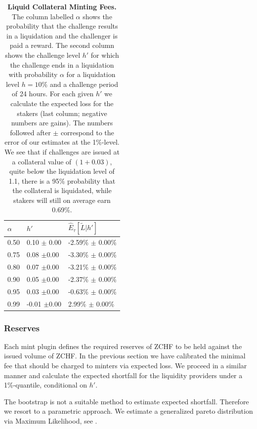 \documentclass[english,11pt]{article}
\begin{document}
\begin{table}[h]
\caption{\textbf{Liquid Collateral Minting Fees.} The column labelled $\alpha$ shows the probability
that the challenge results in a liquidation and the challenger is paid a reward.
The second column shows the challenge level $h'$ for which the challenge ends in a
liquidation with probability $\alpha$ for a liquidation level $h=10\%$ and a challenge
period of 24 hours. For each given $h'$ we calculate the expected loss for the stakers
(last column; negative numbers are gains).
The numbers followed after $\pm$ correspond to the error of our estimates at the 1\%-level.
We see that if challenges are issued at a collateral value of $(1+0.03)$, quite below the 
liquidation level of 1.1, there is
a 95\% probability that the collateral is liquidated, while stakers will still on average
earn 0.69\%.\label{tab:calibration}}
\center
\begin{tabular}{lll}
\toprule
\textbf{$\alpha$} & \textbf{$h'$}   & \textbf{$\hat{E}_{\tau}\left[\tilde{L} | h' \right]$}\\
\midrule
0.50                           & 0.10 $\pm$ 0.00 & -2.59\% $\pm$ 0.00\% \\
0.75                           & 0.08 $\pm$0.00  & -3.30\% $\pm$ 0.00\% \\
0.80                           & 0.07 $\pm$0.00  & -3.21\% $\pm$ 0.00\% \\
0.90                           & 0.05 $\pm$0.00  & -2.37\% $\pm$ 0.00\% \\
0.95                           & 0.03 $\pm$0.00  & -0.63\% $\pm$ 0.00\% \\
0.99                           & -0.01 $\pm$0.00 & 2.99\% $\pm$ 0.00\% \\
\bottomrule
\end{tabular}
\end{table}

\clearpage
\subsubsection{Reserves}
Each mint plugin defines the required reserves of ZCHF to be held against
the issued volume of ZCHF. In the previous section we have calibrated
the minimal fee that should be charged to minters via expected loss.
We proceed in a similar manner and calculate the expected shortfall
for the liquidity providers under a 1\%-quantile, conditional on $h'$.

The bootstrap is not a suitable method to estimate expected shortfall. Therefore we resort
to a parametric approach. We estimate a generalized pareto distribution via
Maximum Likelihood, see \cite{mcneil2015quantitative}.
\end{document}
